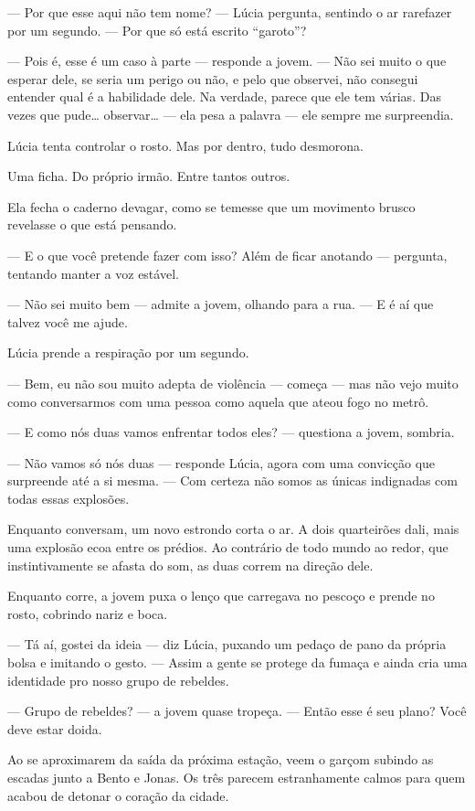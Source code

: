 — Por que esse aqui não tem nome? — Lúcia pergunta, sentindo o ar rarefazer por um segundo. — Por que só está escrito “garoto”?

— Pois é, esse é um caso à parte — responde a jovem. — Não sei muito o que esperar dele, se seria um perigo ou não, e pelo que observei, não consegui entender qual é a habilidade dele.
Na verdade, parece que ele tem várias.  
Das vezes que pude… observar… — ela pesa a palavra — ele sempre me surpreendia.

Lúcia tenta controlar o rosto.  
Mas por dentro, tudo desmorona.

Uma ficha.  
Do próprio irmão.  
Entre tantos outros.

Ela fecha o caderno devagar, como se temesse que um movimento brusco revelasse o que está pensando.

— E o que você pretende fazer com isso? Além de ficar anotando — pergunta, tentando manter a voz estável.

— Não sei muito bem — admite a jovem, olhando para a rua. — E é aí que talvez você me ajude.

Lúcia prende a respiração por um segundo.

— Bem, eu não sou muito adepta de violência — começa — mas não vejo muito como conversarmos com uma pessoa como aquela que ateou fogo no metrô.

— E como nós duas vamos enfrentar todos eles? — questiona a jovem, sombria.

— Não vamos só nós duas — responde Lúcia, agora com uma convicção que surpreende até a si mesma. — Com certeza não somos as únicas indignadas com todas essas explosões.

Enquanto conversam, um novo estrondo corta o ar.  
A dois quarteirões dali, mais uma explosão ecoa entre os prédios.  
Ao contrário de todo mundo ao redor, que instintivamente se afasta do som, as duas correm na direção dele.

Enquanto corre, a jovem puxa o lenço que carregava no pescoço e prende no rosto, cobrindo nariz e boca.

— Tá aí, gostei da ideia — diz Lúcia, puxando um pedaço de pano da própria bolsa e imitando o gesto. — Assim a gente se protege da fumaça e ainda cria uma identidade pro nosso grupo de rebeldes.

— Grupo de rebeldes? — a jovem quase tropeça. — Então esse é seu plano? Você deve estar doida.

Ao se aproximarem da saída da próxima estação, veem o garçom subindo as escadas junto a Bento e Jonas.  
Os três parecem estranhamente calmos para quem acabou de detonar o coração da cidade.

